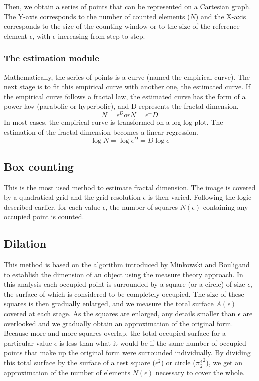 \documentclass[a4paper,10pt]{report}
\begin{document}
Then, we obtain a series of points that can be represented on a Cartesian graph. The Y-axis corresponds to the number of counted elements ($N$) and the X-axis corresponds to the size of the counting window or to the size of the reference element $\epsilon$, with $\epsilon$ increasing from step to step.

\subsubsection{The estimation module}

Mathematically, the series of points is a curve (named the empirical curve). The next stage is to fit this empirical curve with another one, the estimated curve. If the empirical curve follows a fractal law, the estimated curve has the form of a power law (parabolic or hyperbolic), and D represents the fractal dimension.
$$N = \epsilon^D or N = \epsilon^-D$$
In most cases, the empirical curve is transformed on a log-log plot. The estimation of the fractal dimension becomes a linear regression.
$$\log N = \log \epsilon^D = D \log \epsilon$$

\subsection{Box counting}
This is the most used method to estimate fractal dimension. The image is covered by a quadratical grid and the grid resolution $\epsilon$ is then varied. Following the logic described earlier, for each value $\epsilon$, the number of squares $N(\epsilon)$ containing any occupied point is counted. 

\subsection{Dilation}
This method is based on the algorithm introduced by Minkowski and Bouligand to establish the dimension of an object using the measure theory approach. In this analysis each occupied point is surrounded by a square (or a circle) of size $\epsilon$, the surface of which is considered to be completely occupied. The size of these squares is then gradually enlarged, and we measure the total surface $A(\epsilon)$ covered at each stage. As the squares are enlarged, any details smaller than $\epsilon$ are overlooked and we gradually obtain an approximation of the original form. Because more and more squares overlap, the total occupied surface for a particular value $\epsilon$ is less than what it would be if the same number of occupied points that make up the original form were surrounded individually. By dividing this total surface by the surface of a test square ($\epsilon^2$) or circle ($\pi\frac{\epsilon}{2}^2$), we get an approximation of the number of elements $N(\epsilon)$ necessary to cover the whole.
\end{document}
